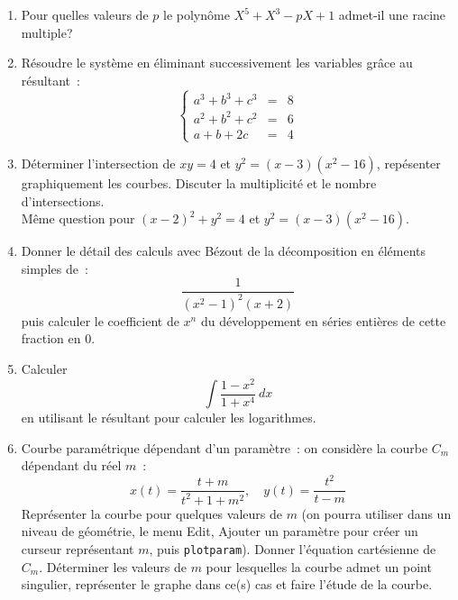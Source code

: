 \documentclass[a4paper,11pt]{article}
\begin{document}
\begin{giacjshere}
\begin{enumerate}
\item Pour quelles valeurs de $p$ le polyn\^ome $X^5+X^3-pX+1$ admet-il
une racine multiple?
\item R\'esoudre le syst\`eme en \'eliminant successivement les
variables gr\^ace au r\'esultant~:
\[
\left\{\begin{array}{rcl}
a^{3}+b^{3}+c^{3} & = & 8 \\
a^{2}+b^{2}+c^{2} & = & 6 \\
a+b+2c & = & 4
\end{array}\right.
\]
\item D\'eterminer l'intersection de $xy=4$ et $ y^2=(x-3)(x^2-16)$,
rep\'esenter graphiquement les courbes. Discuter la multiplicit\'e
et le nombre d'intersections.\\
M\^eme question pour $(x-2)^2+y^2=4$ et $y^2=(x-3)(x^2-16)$.
\item Donner le d\'etail des calculs avec B\'ezout de la d\'ecomposition
en \'el\'ements simples de~:
\[ \frac{1}{(x^2-1)^2(x+2)}\]
puis calculer le coefficient de $x^n$ du d\'eveloppement en s\'eries
enti\`eres de cette fraction en 0.
\item Calculer 
\[ \int \frac{1-x^2}{1+x^4} \ dx \]
en utilisant le r\'esultant pour calculer les logarithmes.
\item Courbe param\'etrique d\'ependant d'un param\`etre~:
on consid\`ere la courbe $C_m$ d\'ependant du r\'eel $m$~:
$$ x(t)=\frac{t+m}{t^2+1+m^2}, \quad y(t)=\frac{t^2}{t-m}$$
Repr\'esenter la courbe pour quelques valeurs de $m$ (on pourra
utiliser dans un niveau de g\'eom\'etrie, le menu Edit, Ajouter un
param\`etre pour cr\'eer un curseur repr\'esentant $m$, puis 
\verb|plotparam|). Donner l'\'equation cart\'esienne de $C_m$.
D\'eterminer les valeurs de $m$ pour lesquelles
la courbe admet un point singulier, repr\'esenter le graphe dans ce(s)
cas et faire l'\'etude de la courbe.
\end{enumerate}


\end{giacjshere}
\end{document}
